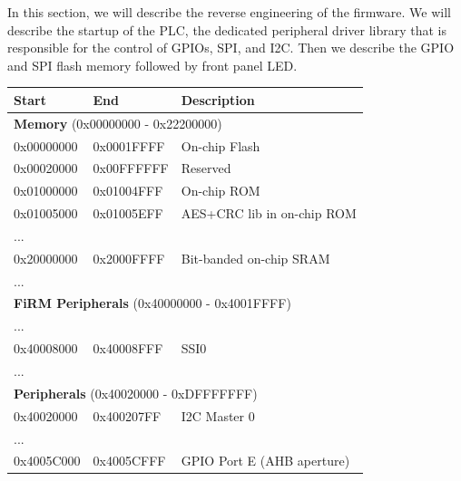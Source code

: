 In this section, we will describe the reverse engineering of the firmware. We will describe the startup of the PLC, the dedicated peripheral driver library that is responsible for the control of GPIOs, SPI, and I2C. Then we describe the GPIO and SPI flash memory followed by front panel LED.

\begin{center}
	\begin{table}
		\small
		\begin{tabular}{p{1.6cm}  p{1.6cm}  p{4cm}} 
			\hline
			Start & End & Description \\ 
			\hline
			\multicolumn{3}{l}{\textbf{Memory} (0x00000000 - 0x22200000)}  \\
			\hline
			0x00000000 & 0x0001FFFF & On-chip Flash \\ 
			\hline
			0x00020000 & 0x00FFFFFF & Reserved \\
			\hline
			0x01000000 & 0x01004FFF & On-chip ROM  \\
			\hline
			0x01005000 & 0x01005EFF & AES+CRC lib in on-chip ROM   \\
			\hline
			... & & \\
			\hline
			0x20000000 & 0x2000FFFF & Bit-banded on-chip SRAM \\
			\hline
			... & & \\
			\hline
			\multicolumn{3}{l}{\textbf{FiRM Peripherals} (0x40000000 - 0x4001FFFF)}  \\
			\hline
			... & & \\
			\hline
			0x40008000 & 0x40008FFF & SSI0 \\
			\hline
			... & & \\
			\hline
			\multicolumn{3}{l}{\textbf{Peripherals} (0x40020000 - 0xDFFFFFFF)}  \\
			\hline
			0x40020000 & 0x400207FF & I2C Master 0 \\
			\hline
			... & & \\
			\hline
			0x4005C000 & 0x4005CFFF & GPIO Port E (AHB aperture) \\

\end{tabular}
\end{table}
\end{center}
